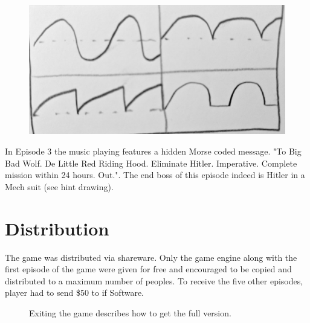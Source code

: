 \documentclass[book.tex]{subfiles}
\begin{document}
\par
\begin{figure}[H]
\centering
 \includegraphics[width=\textwidth]{imgs/drawings/wave.png}
\end{figure}


 In Episode 3 the music playing features a hidden Morse coded message. "To Big Bad Wolf. De Little Red Riding Hood. Eliminate Hitler. Imperative. Complete mission within 24 hours. Out.". The end boss of this episode indeed is Hitler in a Mech suit (see hint drawing).




























\section{Distribution}
The game was distributed via shareware. Only the game engine along with the first episode of the game were given for free and encouraged to be copied and distributed to a maximum number of peoples. To receive the five other episodes, player had to send \$50 to if Software.\\
\par
\begin{figure}[H]
\centering
 \caption{Exiting the game describes how to get the full version.}
 \end{figure}
\end{document}

